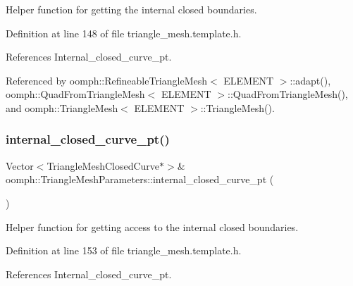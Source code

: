 Helper function for getting the internal closed boundaries. 



Definition at line 148 of file triangle\+\_\+mesh.\+template.\+h.



References Internal\+\_\+closed\+\_\+curve\+\_\+pt.



Referenced by oomph\+::\+Refineable\+Triangle\+Mesh$<$ E\+L\+E\+M\+E\+N\+T $>$\+::adapt(), oomph\+::\+Quad\+From\+Triangle\+Mesh$<$ E\+L\+E\+M\+E\+N\+T $>$\+::\+Quad\+From\+Triangle\+Mesh(), and oomph\+::\+Triangle\+Mesh$<$ E\+L\+E\+M\+E\+N\+T $>$\+::\+Triangle\+Mesh().

\mbox{\label{classoomph_1_1TriangleMeshParameters_a7a539affa9d589ef9c14ae7d7bb7f458}} 
\subsubsection{\texorpdfstring{internal\+\_\+closed\+\_\+curve\+\_\+pt()}{internal\_closed\_curve\_pt()}\hspace{0.1cm}{\footnotesize\ttfamily [2/2]}}
{\footnotesize\ttfamily Vector$<$Triangle\+Mesh\+Closed\+Curve$\ast$$>$\& oomph\+::\+Triangle\+Mesh\+Parameters\+::internal\+\_\+closed\+\_\+curve\+\_\+pt (\begin{DoxyParamCaption}{ }\end{DoxyParamCaption})\hspace{0.3cm}{\ttfamily [inline]}}



Helper function for getting access to the internal closed boundaries. 



Definition at line 153 of file triangle\+\_\+mesh.\+template.\+h.



References Internal\+\_\+closed\+\_\+curve\+\_\+pt.

\mbox{\label{classoomph_1_1TriangleMeshParameters_ac2afa4153679c9319b3175e61973f938}} 
